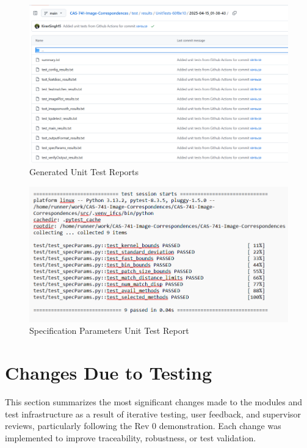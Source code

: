 \documentclass[12pt, titlepage]{article}
\begin{document}
\begin{figure}
  \centering
  \includegraphics[width=1.2\linewidth]{images/ut_reports.png}
  \caption{Generated Unit Test Reports}
  \label{unit_tests_reports}
\end{figure}

\begin{figure}
  \centering
  \includegraphics[width=0.9\linewidth]{images/specParams_report.png}
  \caption{Specification Parameters Unit Test Report}
  \label{sp_report}
\end{figure}


\section{Changes Due to Testing}

This section summarizes the most significant changes made to the modules and test infrastructure as a result of iterative testing, user feedback, and supervisor reviews, particularly following the Rev 0 demonstration. Each change was implemented to improve traceability, robustness, or test validation.
\end{document}
